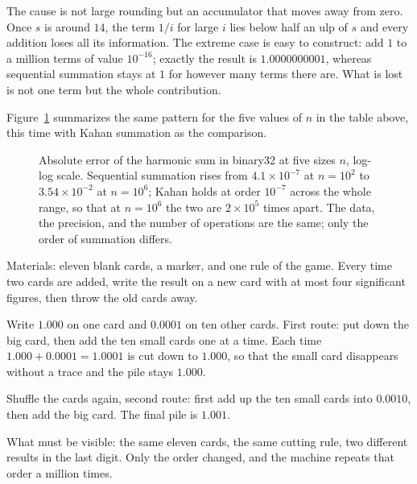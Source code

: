 The cause is not large rounding but an accumulator that moves away from zero.
Once $s$ is around $14$, the term $1/i$ for large $i$ lies below half an
ulp of $s$ and every addition loses all its information. The extreme case is easy to
construct: add $1$ to a million terms of value $10^{-16}$; exactly the result is
$1.0000000001$, whereas sequential summation stays at $1$ for however many terms there
are. What is lost is not one term but the whole contribution.

Figure~\ref{fig:galatjumlah} summarizes the same pattern for the five values of $n$ in the
table above, this time with Kahan summation as the comparison.

\begin{figure}[htbp]
\centering
{}
\caption{Absolute error of the harmonic sum in binary32 at five sizes $n$, log-log
scale. Sequential summation rises from $4.1\times10^{-7}$ at $n=10^{2}$ to
$3.54\times10^{-2}$ at $n=10^{6}$; Kahan holds at order $10^{-7}$ across the whole
range, so that at $n=10^{6}$ the two are $2\times10^{5}$ times apart. The data, the
precision, and the number of operations are the same; only the order of summation
differs.}
\label{fig:galatjumlah}
\end{figure}

\begin{tangan}
Materials: eleven blank cards, a marker, and one rule of the game. Every time two cards
are added, write the result on a new card with at most four significant figures,
then throw the old cards away.

Write $1.000$ on one card and $0.0001$ on ten other cards. First route: put down the big
card, then add the ten small cards one at a time. Each time
$1.000+0.0001=1.0001$ is cut down to $1.000$, so that the small card disappears
without a trace and the pile stays $1.000$.

Shuffle the cards again, second route: first add up the ten small cards into
$0.0010$, then add the big card. The final pile is $1.001$.

What must be visible: the same eleven cards, the same cutting rule, two
different results in the last digit. Only the order changed, and the machine repeats that
order a million times.
\end{tangan}

